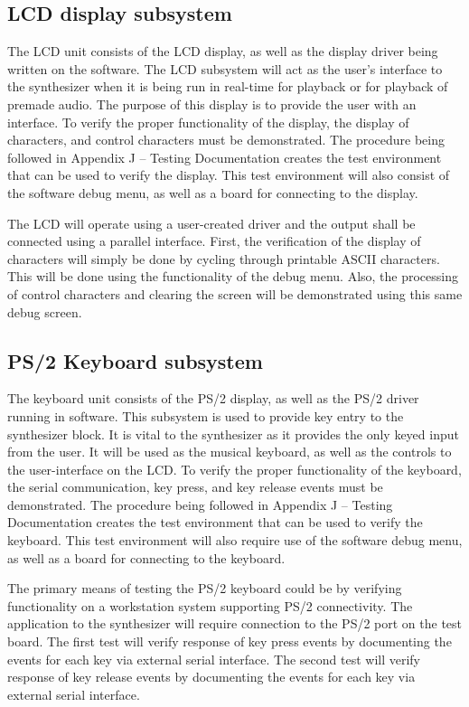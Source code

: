 \documentclass[bibtotocnumbered,abstract=on,paper=a4,fontsize=12pt,parskip=on,halfparskip=on]{scrartcl}		%
\begin{document}
  \subsection{LCD display subsystem}
    The LCD unit consists of the LCD display, as well as the display driver being written on the software. The LCD subsystem will act as the user's interface to the synthesizer when it is being run in real-time for playback or for playback of premade audio. The purpose of this display is to provide the user with an interface. To verify the proper functionality of the display, the display of characters, and control characters must be demonstrated. The procedure being followed in Appendix J – Testing Documentation creates the test environment that can be used to verify the display. This test environment will also consist of the software debug menu, as well as a board for connecting to the display.\par
      The LCD will operate using a user-created driver and the output shall be connected using a parallel interface. First, the verification of the display of characters will simply be done by cycling through printable ASCII characters. This will be done using the functionality of the debug menu. Also, the processing of control characters and clearing the screen will be demonstrated using this same debug screen.\par
  \subsection{PS/2 Keyboard subsystem}
    The keyboard unit consists of the PS/2 display, as well as the PS/2 driver running in software. This subsystem is used to provide key entry to the synthesizer block. It is vital to the synthesizer as it provides the only keyed input from the user. It will be used as the musical keyboard, as well as the controls to the user-interface on the LCD. To verify the proper functionality of the keyboard, the serial communication, key press, and key release events must be demonstrated. The procedure being followed in Appendix J – Testing Documentation creates the test environment that can be used to verify the keyboard. This test environment will also require use of the software debug menu, as well as a board for connecting to the keyboard.\par
      The primary means of testing the PS/2 keyboard could be by verifying functionality on a workstation system supporting PS/2 connectivity. The application to the synthesizer will require connection to the PS/2 port on the test board. The first test will verify response of key press events by documenting the events for each key via external serial interface.  The second test will verify response of key release events by documenting the events for each key via external serial interface.\par
\end{document}
